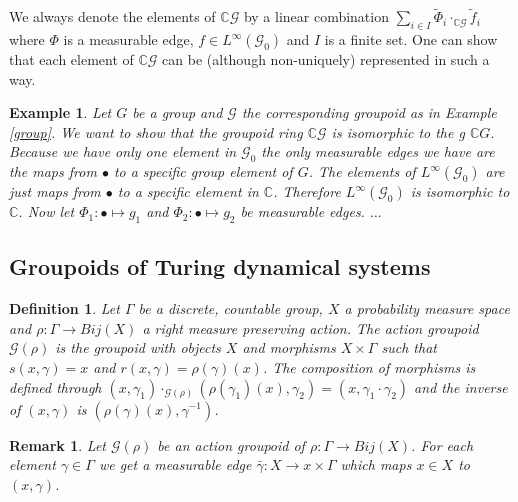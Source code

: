 \documentclass[12pt,a4paper]{scrartcl}
\newtheorem{Definition}[Theorem]{Definition}
\newtheorem{Example}[Theorem]{Example}
\newtheorem{Remark}[Theorem]{Remark}
\numberwithin{equation}{section}
\newcommand{\C}{\mathbb{C}} %
\newcommand{\2}{\mathbb{Z} / 2 \mathbb{Z}}
\newcommand{\G}{\mathcal{G}}
\newcommand{\1}{\bar{1}}
\newcommand{\0}{\bar{0}}
\begin{document}
We always denote the elements of $\C\G$ by a linear combination $\sum_{i \in I} \tilde \Phi_i \cdot_{\C \G} \tilde f_i$ where $\Phi$ is a measurable edge, $f \in L^\infty(\G_0)$ and $I$ is a finite set. One can show that each element of $\C \G$ can be (although non-uniquely) represented in such a way. 
\begin{Example}
	Let $G$ be a group and $\G$ the corresponding groupoid as in Example \ref{group}. We want to show that the groupoid ring $\C \G$ is isomorphic to the g $\C G$. Because we have only one element in $\G_0$ the only measurable edges we have are the maps from $\bullet$ to a specific group element of $G$. The elements of $L^\infty(\G_0)$ are just maps from $\bullet$ to a specific element in $\C$. Therefore  $L^\infty(\G_0)$ is isomorphic to $\C$. Now let $\Phi_1: \bullet \mapsto g_1$ and $\Phi_2: \bullet \mapsto g_2$ be measurable edges. $\ldots$
\end{Example}


\subsection{Groupoids of Turing dynamical systems}
\begin{Definition}
	Let $\Gamma$ be a discrete, countable group, $X$ a probability measure space and $\rho: \Gamma \to Bij(X)$ a right measure preserving action. The action groupoid $\G(\rho)$ is the groupoid with objects $X$ and morphisms $X \times \Gamma$ such that $s(x,\gamma) = x$ and $r(x, \gamma) = \rho(\gamma) (x)$. The composition of morphisms is defined through $(x, \gamma_1) \cdot_{\G(\rho)} (\rho(\gamma_1) (x), \gamma_2) = (x, \gamma_1 \cdot \gamma_2)$ and the inverse of $(x, \gamma)$ is $(\rho(\gamma) (x), \gamma^{-1})$.
\end{Definition}

\begin{Remark}
	Let $\G(\rho)$ be an action groupoid of $\rho: \Gamma \to Bij(X)$. For each element $\gamma \in \Gamma$ we get a measurable edge $\bar{\gamma}: X \to x \times \Gamma$ which maps $x \in X$ to $(x, \gamma)$.
\end{Remark}
\end{document}
